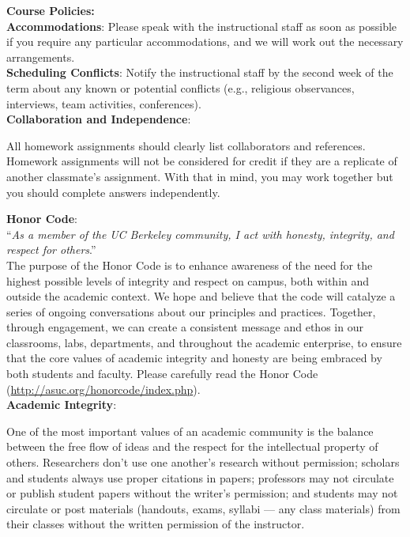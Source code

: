 \documentclass[11pt]{article}
\begin{document}
\textbf{\large Course Policies:} \\

\textbf{Accommodations}:
Please speak with the instructional staff as soon as possible if you require any
particular accommodations, and we will work out the necessary arrangements. \\

\textbf{Scheduling Conflicts}:
Notify the instructional staff by the second week of the term about any known or
potential conflicts (e.g., religious observances, interviews, team activities,
conferences). \\

\textbf{Collaboration and Independence}:

All homework assignments should clearly list collaborators and references.
Homework assignments will not be considered for credit if they are a replicate
of another classmate's assignment. With that in mind, you may work together but
you should complete answers independently. \\

\newpage

\textbf{Honor Code}: \\

``\textit{As a member of the UC Berkeley community, I act with honesty,
integrity, and respect for others}.'' \\

The purpose of the Honor Code is to enhance awareness of the need for the
highest possible levels of integrity and respect on campus, both within and
outside the academic context. We hope and believe that the code will catalyze a
series of ongoing conversations about our principles and practices. Together,
through engagement, we can create a consistent message and ethos in our
classrooms, labs, departments, and throughout the academic enterprise, to ensure
that the core values of academic integrity and honesty are being embraced by
both students and faculty. Please carefully read the Honor
Code (\url{http://asuc.org/honorcode/index.php}).\\

\textbf{Academic Integrity}:

One of the most important values of an academic community is the balance between
the free flow of ideas and the respect for the intellectual property of others.
Researchers don't use one another's research without permission; scholars and
students always use proper citations in papers; professors may not circulate or
publish student papers without the writer's permission; and students may not
circulate or post materials (handouts, exams, syllabi --- any class materials)
from their classes without the written permission of the instructor.
\end{document}
